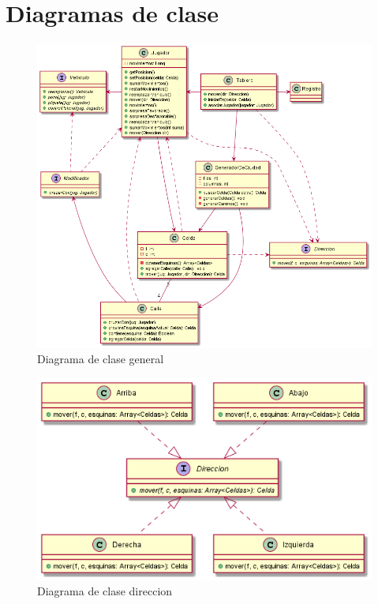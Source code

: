 \documentclass[titlepage,a4paper]{article}
\begin{document}
\section{Diagramas de clase}\label{sec:diagramasdeclase}

\begin{figure}[H]
  \centering
  \includegraphics[width=1\textwidth]{diagramas/modelo-inicial.png}
  \caption{\label{fig:seq01} Diagrama de clase general}
\end{figure}

\begin{figure}[H]
  \centering
  \includegraphics[width=1\textwidth]{diagramas/ClaseDireccion.png}
  \caption{\label{fig:seq02} Diagrama de clase direccion}
\end{figure}
\end{document}
